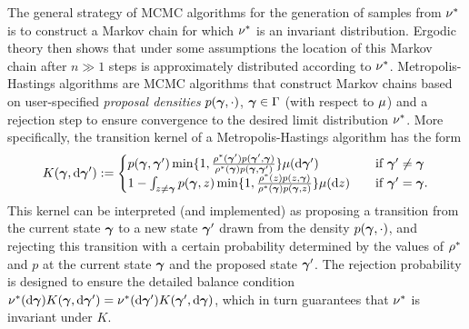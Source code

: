 The general strategy of MCMC algorithms for the generation of samples from $\nu^{*}$ is to construct a Markov chain for which $\nu^{*}$ is an invariant distribution. Ergodic theory then shows that under some assumptions the location of this Markov chain after $n\gg1$ steps is approximately distributed according to $\nu^{*}$.
Metropolis-Hastings algorithms are MCMC algorithms that construct Markov chains based on user-specified \emph{proposal densities} $p(\bm{\gamma},\cdot)$, $\bm{\gamma}\in\Gamma$ (with respect to $\mu$) and a rejection step to ensure convergence to the desired limit distribution $\nu^{*}$. More specifically, the transition kernel of a Metropolis-Hastings algorithm has the form
\begin{equation}
\label{eq:MC}
K(\bm{\gamma},\mathrm{d}\bm{\gamma}'):=\begin{cases}
p(\bm{\gamma},\bm{\gamma}')\min\{1,\frac{\rho^{*}(\bm{\gamma}')p(\bm{\gamma}',\bm{\gamma})}{\rho^{*}(\bm{\gamma})p(\bm{\gamma},\bm{\gamma}')}\}\mu(\mathrm{d}\bm{\gamma}')\quad&\text{if }\bm{\gamma}'\not = \bm{\gamma}\\
1-\int_{z\not = \bm{\gamma}}p(\bm{\gamma},z)\min\{1,\frac{\rho^{*}(z)p(z,\bm{\gamma})}{\rho^{*}(\bm{\gamma})p(\bm{\gamma},z)}\}\mu(\mathrm{d}z)\quad &\text{if }\bm{\gamma}'=\bm{\gamma}.
\end{cases}
\end{equation}
This kernel can be interpreted (and implemented) as proposing a transition from the current state $\bm{\gamma}$ to a new state $\bm{\gamma}'$ drawn from the density $p(\bm{\gamma},\cdot)$, and rejecting this transition with a certain probability determined by the values of $\rho^{*}$ and $p$ at the current state $\bm{\gamma}$ and the proposed state $\bm{\gamma}'$. The rejection probability is designed to ensure the detailed balance condition $\nu^{*}(\mathrm{d}\bm{\gamma})K(\bm{\gamma},\mathrm{d}\bm{\gamma}')=\nu^{*}(\mathrm{d}\bm{\gamma}')K(\bm{\gamma}',\mathrm{d}\bm{\gamma})$, which in turn guarantees that $\nu^{*}$ is invariant under $K$.

